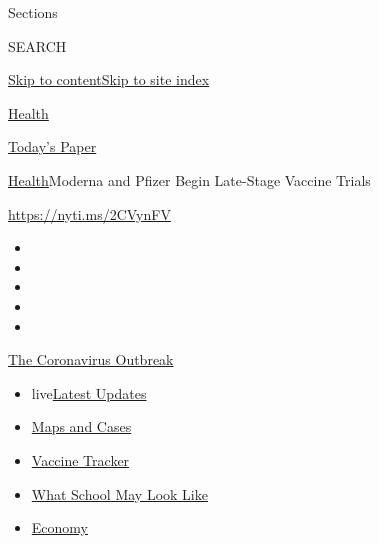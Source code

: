 Sections

SEARCH

\protect\hyperlink{site-content}{Skip to
content}\protect\hyperlink{site-index}{Skip to site index}

\href{https://www.nytimes3xbfgragh.onion/section/health}{Health}

\href{https://myaccount.nytimes3xbfgragh.onion/auth/login?response_type=cookie\&client_id=vi}{}

\href{https://www.nytimes3xbfgragh.onion/section/todayspaper}{Today's
Paper}

\href{/section/health}{Health}\textbar{}Moderna and Pfizer Begin
Late-Stage Vaccine Trials

\url{https://nyti.ms/2CVynFV}

\begin{itemize}
\item
\item
\item
\item
\item
\end{itemize}

\href{https://www.nytimes3xbfgragh.onion/news-event/coronavirus?action=click\&pgtype=Article\&state=default\&region=TOP_BANNER\&context=storylines_menu}{The
Coronavirus Outbreak}

\begin{itemize}
\tightlist
\item
  live\href{https://www.nytimes3xbfgragh.onion/2020/08/02/world/coronavirus-updates.html?action=click\&pgtype=Article\&state=default\&region=TOP_BANNER\&context=storylines_menu}{Latest
  Updates}
\item
  \href{https://www.nytimes3xbfgragh.onion/interactive/2020/us/coronavirus-us-cases.html?action=click\&pgtype=Article\&state=default\&region=TOP_BANNER\&context=storylines_menu}{Maps
  and Cases}
\item
  \href{https://www.nytimes3xbfgragh.onion/interactive/2020/science/coronavirus-vaccine-tracker.html?action=click\&pgtype=Article\&state=default\&region=TOP_BANNER\&context=storylines_menu}{Vaccine
  Tracker}
\item
  \href{https://www.nytimes3xbfgragh.onion/interactive/2020/07/29/us/schools-reopening-coronavirus.html?action=click\&pgtype=Article\&state=default\&region=TOP_BANNER\&context=storylines_menu}{What
  School May Look Like}
\item
  \href{https://www.nytimes3xbfgragh.onion/live/2020/07/31/business/stock-market-today-coronavirus?action=click\&pgtype=Article\&state=default\&region=TOP_BANNER\&context=storylines_menu}{Economy}
\end{itemize}

